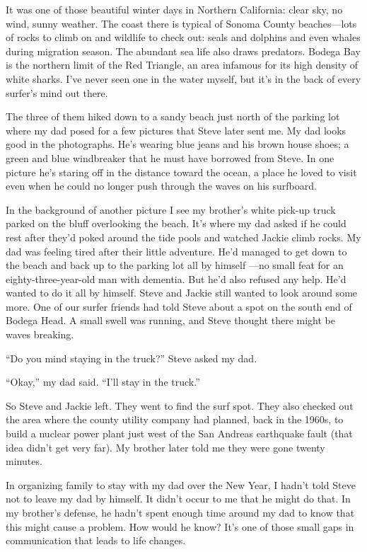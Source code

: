 \documentclass[12pt]{book}
\begin{document}
It was one of those beautiful winter days in Northern California: clear sky, no wind, sunny weather. The coast there is typical of Sonoma County beaches---lots of rocks to climb on and wildlife to check out: seals and dolphins and even whales during migration season. The abundant sea life also draws predators. Bodega Bay is the northern limit of the Red Triangle, an area infamous for its high density of white sharks. I've never seen one in the water myself, but it's in the back of every surfer's mind out there.

The three of them hiked down to a sandy beach just north of the parking lot where my dad posed for a few pictures that Steve later sent me. My dad looks good in the photographs. He's wearing blue jeans and his brown house shoes; a green and blue windbreaker that he must have borrowed from Steve. In one picture he's staring off in the distance toward the ocean, a place he loved to visit even when he could no longer push through the waves on his surfboard.

In the background of another picture I see my brother's white pick-up truck parked on the bluff overlooking the beach. It's where my dad asked if he could rest after they'd poked around the tide pools and watched Jackie climb rocks. My dad was feeling tired after their little adventure. He'd managed to get down to the beach and back up to the parking lot all by himself ---no small feat for an eighty-three-year-old man with dementia. But he'd also refused any help. He'd wanted to do it all by himself. Steve and Jackie still wanted to look around some more. One of our surfer friends had told Steve about a spot on the south end of Bodega Head. A small swell was running, and Steve thought there might be waves breaking.

``Do you mind staying in the truck?'' Steve asked my dad.

``Okay,'' my dad said. ``I'll stay in the truck.''

So Steve and Jackie left. They went to find the surf spot. They also checked out the area where the county utility company had planned, back in the 1960s, to build a nuclear power plant just west of the San Andreas earthquake fault (that idea didn't get very far). My brother later told me they were gone twenty minutes.

In organizing family to stay with my dad over the New Year, I hadn't told Steve not to leave my dad by himself. It didn't occur to me that he might do that. In my brother's defense, he hadn't spent enough time around my dad to know that this might cause a problem. How would he know? It's one of those small gaps in communication that leads to life changes.
\end{document}
